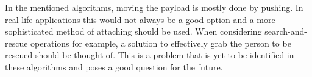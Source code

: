 In the mentioned algorithms, moving the payload is mostly done by pushing. 
In real-life applications this would not always be a good option and a more sophisticated method of attaching should be used. 
When considering search-and-rescue operations for example, a solution to effectively grab the person to be rescued should be thought of. 
This is a problem that is yet to be identified in these algorithms and poses a good question for the future.
